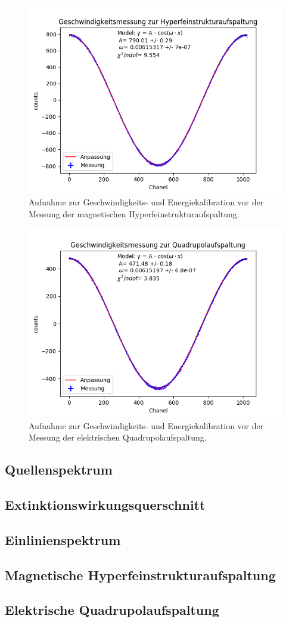 \documentclass[12pt,a4paper]{article}
\begin{document}
\begin{figure} [H]
\centering
\includegraphics[scale=0.8]{Bilder/Kalibration/Hyperfein.png}
\caption{Aufnahme zur Geschwindigkeits- und Energiekalibration vor der Messung der magnetischen Hyperfeinstrukturaufspaltung.}
\end{figure}

\begin{figure} [H]
\centering
\includegraphics[scale=0.8]{Bilder/Kalibration/Quadrupol.png}
\caption{Aufnahme zur Geschwindigkeits- und Energiekalibration vor der Messung der elektrischen Quadrupolaufspaltung.}
\end{figure}

\subsection{Quellenspektrum}
\subsection{Extinktionswirkungsquerschnitt}
\subsection{Einlinienspektrum}
\subsection{Magnetische Hyperfeinstrukturaufspaltung}
\subsection{Elektrische Quadrupolaufspaltung}
\end{document}
